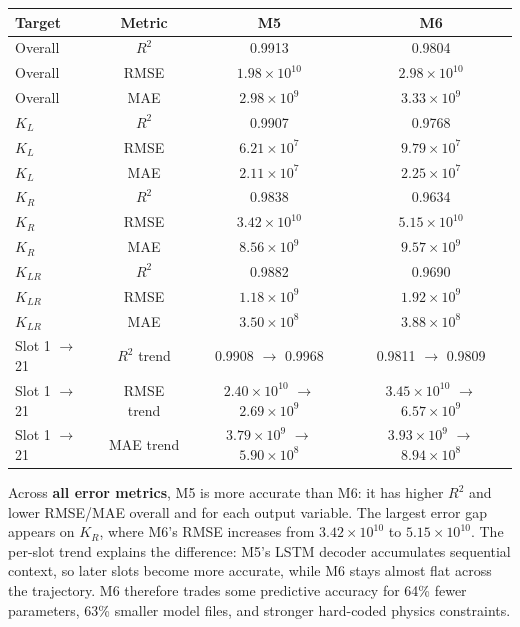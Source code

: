 \documentclass[11pt,a4paper]{article}
\begin{document}
\begin{center}
\small
\begin{tabular}{@{}lccc@{}}
\toprule
\textbf{Target} & \textbf{Metric} & \textbf{M5} & \textbf{M6} \\
\midrule
Overall & $R^2$ & 0.9913 & 0.9804 \\
Overall & RMSE & $1.98\times 10^{10}$ & $2.98\times 10^{10}$ \\
Overall & MAE & $2.98\times 10^{9}$ & $3.33\times 10^{9}$ \\
\midrule
$K_L$ & $R^2$ & 0.9907 & 0.9768 \\
$K_L$ & RMSE & $6.21\times 10^{7}$ & $9.79\times 10^{7}$ \\
$K_L$ & MAE & $2.11\times 10^{7}$ & $2.25\times 10^{7}$ \\
\midrule
$K_R$ & $R^2$ & 0.9838 & 0.9634 \\
$K_R$ & RMSE & $3.42\times 10^{10}$ & $5.15\times 10^{10}$ \\
$K_R$ & MAE & $8.56\times 10^{9}$ & $9.57\times 10^{9}$ \\
\midrule
$K_{LR}$ & $R^2$ & 0.9882 & 0.9690 \\
$K_{LR}$ & RMSE & $1.18\times 10^{9}$ & $1.92\times 10^{9}$ \\
$K_{LR}$ & MAE & $3.50\times 10^{8}$ & $3.88\times 10^{8}$ \\
\midrule
Slot 1 $\to$ 21 & $R^2$ trend & 0.9908 $\to$ 0.9968 & 0.9811 $\to$ 0.9809 \\
Slot 1 $\to$ 21 & RMSE trend & $2.40\times 10^{10}$ $\to$ $2.69\times 10^{9}$ & $3.45\times 10^{10}$ $\to$ $6.57\times 10^{9}$ \\
Slot 1 $\to$ 21 & MAE trend & $3.79\times 10^{9}$ $\to$ $5.90\times 10^{8}$ & $3.93\times 10^{9}$ $\to$ $8.94\times 10^{8}$ \\
\bottomrule
\end{tabular}
\end{center}

Across \textbf{all error metrics}, M5 is more accurate than M6: it has higher $R^2$ and lower RMSE/MAE overall and for each output variable. The largest error gap appears on $K_R$, where M6's RMSE increases from $3.42\times 10^{10}$ to $5.15\times 10^{10}$. The per-slot trend explains the difference: M5's LSTM decoder accumulates sequential context, so later slots become more accurate, while M6 stays almost flat across the trajectory. M6 therefore trades some predictive accuracy for 64\% fewer parameters, 63\% smaller model files, and stronger hard-coded physics constraints.
\end{document}
